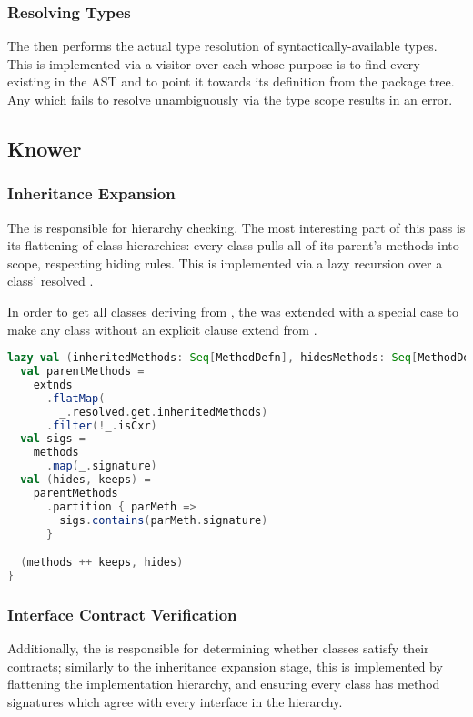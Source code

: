 \documentclass{article}
\begin{document}
\subsubsection{Resolving Types}
The  then performs the actual type resolution of syntactically-available types. This is implemented via a
visitor over each  whose purpose is to find every  existing in the AST and to point it
towards its definition from the package tree. Any  which fails to resolve unambiguously via the type
scope results in an error.



\subsection{Knower}
\subsubsection{Inheritance Expansion}
The  is responsible for hierarchy checking. The most interesting part of this pass is its flattening of
class hierarchies: every class pulls all of its parent's methods into scope, respecting hiding rules. This is
implemented via a lazy recursion over a class' resolved .

In order to get all classes deriving from , the  was extended with a special case to
make any class without an explicit  clause extend from .

\newpage
\begin{lstlisting}[language=Scala]
lazy val (inheritedMethods: Seq[MethodDefn], hidesMethods: Seq[MethodDefn]) = {
  val parentMethods =
    extnds
      .flatMap(
        _.resolved.get.inheritedMethods)
      .filter(!_.isCxr)
  val sigs =
    methods
      .map(_.signature)
  val (hides, keeps) =
    parentMethods
      .partition { parMeth =>
        sigs.contains(parMeth.signature)
      }

  (methods ++ keeps, hides)
}
\end{lstlisting}

\subsubsection{Interface Contract Verification}
Additionally, the  is responsible for determining whether classes satisfy their 
contracts; similarly to the inheritance expansion stage, this is implemented by flattening the implementation hierarchy,
and ensuring every class has method signatures which agree with every interface in the hierarchy.
\end{document}
